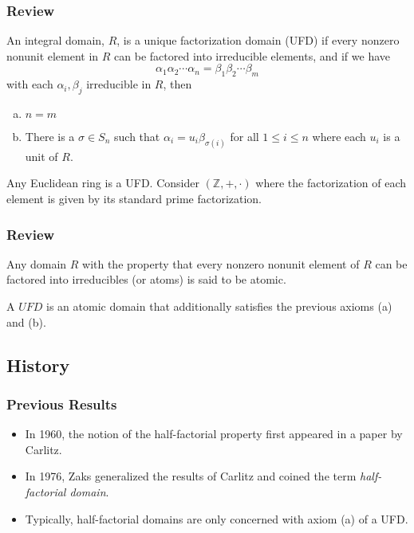 \begin{frame}
  \frametitle{Review}
  \begin{definition}
    An integral domain, $R$, is a \alert{unique factorization domain (UFD)} if every nonzero nonunit element in $R$ can be factored into irreducible elements, and if we have
    $$ \alpha_1 \alpha_2 \cdots \alpha_n = \beta_1 \beta_2 \cdots \beta_m $$
    with each $\alpha_i, \beta_j$ irreducible in $R$, then
    \begin{enumerate}[(a)]
      \item $n = m$
      \item There is a $\sigma \in S_n$ such that $\alpha_i = u_i \beta_{\sigma(i)}$ for all $1 \leq i \leq n$ where each $u_i$ is a unit of $R$.
    \end{enumerate}
  \end{definition}
\end{frame}
\begin{frame}
  \begin{example}
    Any Euclidean ring is a UFD.
    Consider $(\mathbb{Z}, +, \cdot)$ where the factorization of each element is given by its standard prime factorization.
  \end{example}
\end{frame}

\begin{frame}
  \frametitle{Review}
  \begin{definition}
    Any domain $R$ with the property that every nonzero nonunit element of $R$ can be factored into irreducibles (or atoms) is said to be \alert{atomic}.
  \end{definition}
  \pause
  \begin{fact}
    A $UFD$ is an atomic domain that additionally satisfies the previous axioms (a) and (b).
  \end{fact}
\end{frame}

\subsection{History}

\begin{frame}
  \frametitle{Previous Results}
  \begin{itemize}
    \item<1-> In 1960, the notion of the half-factorial property first appeared in a paper by Carlitz.
    \item<2-> In 1976, Zaks generalized the results of Carlitz and coined the term \emph{half-factorial domain}.
    \item<3-> Typically, half-factorial domains are only concerned with axiom (a) of a UFD.
  \end{itemize}
\end{frame}

